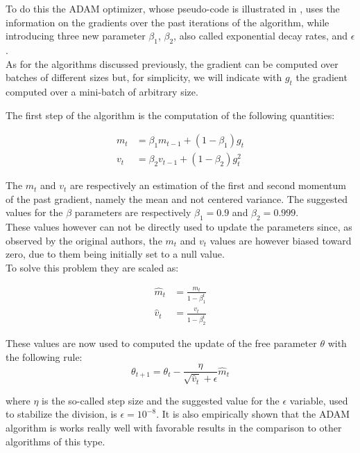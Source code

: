 To do this the ADAM optimizer, whose pseudo-code is illustrated in , uses the information on the gradients over the past iterations of the algorithm, while introducing three new parameter $\beta_1$, $\beta_2$, also called exponential decay rates, and $\epsilon$. \\
As for the algorithms discussed previously, the gradient can be computed over batches of different sizes but, for simplicity, we will indicate with $g_t$ the gradient computed over a mini-batch of arbitrary size. 

The first step of the algorithm is the computation of the following quantities:

\begin{equation}
\begin{aligned}
m_{t} &=\beta_{1} m_{t-1}+\left(1-\beta_{1}\right) g_{t} \\
v_{t} &=\beta_{2} v_{t-1}+\left(1-\beta_{2}\right) g_{t}^{2}
\end{aligned}
\end{equation}

The $m_t$ and $v_t$ are respectively an estimation of the first and second momentum of the past gradient, namely the mean and not centered variance. The suggested values for the $\beta$ parameters are respectively $\beta_1=0.9$ and $\beta_2=0.999$. \\
These values however can not be directly used to update the parameters since, as observed by the original authors, the $m_t$ and $v_t$ values are however biased toward zero, due to them being initially set to a null value. \\
To solve this problem they are scaled as:

\begin{equation}
\begin{aligned}
\hat{m}_{t} &=\frac{m_{t}}{1-\beta_{1}^{t}} \\
\hat{v}_{t} &=\frac{v_{t}}{1-\beta_{2}^{t}}
\end{aligned}
\end{equation}

\smallskip

These values are now used to computed the update of the free parameter $\theta$ with the following rule:
\begin{equation}
\theta_{t+1}=\theta_{t}-\frac{\eta}{\sqrt{\hat{v}_{t}}+\epsilon} \hat{m}_{t}
\end{equation}

where $\eta$ is the so-called step size and the suggested value for the $\epsilon$ variable, used to stabilize the division, is $\epsilon=10^{-8}$. It is also empirically shown that the ADAM algorithm is works really well with favorable results in the comparison to other algorithms of this type.




